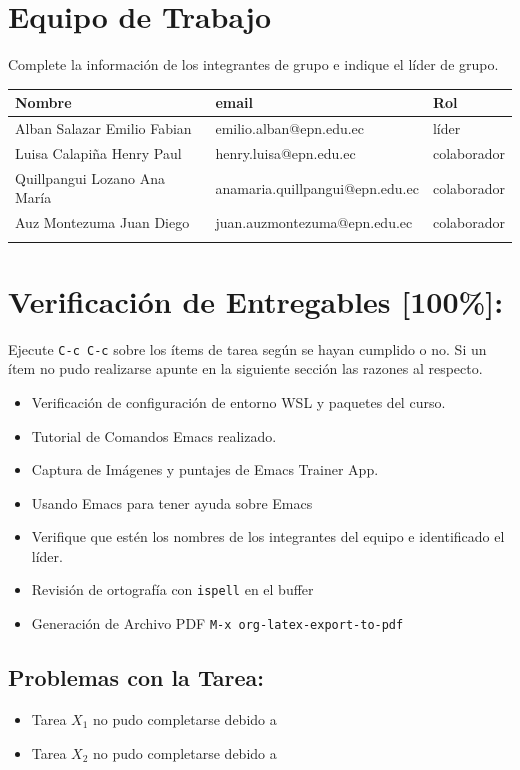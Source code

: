 \documentclass{article}
\begin{document}
\section{Equipo de Trabajo}
\label{sec:org3ceee4a}
Complete la información de los integrantes de grupo e indique el líder
de grupo.

\begin{center}
\begin{tabular}{lll}
\hline
Nombre & email & Rol\\[0pt]
\hline
Alban Salazar Emilio Fabian & emilio.alban@epn.edu.ec & líder\\[0pt]
Luisa Calapiña Henry Paul & henry.luisa@epn.edu.ec & colaborador\\[0pt]
Quillpangui Lozano Ana María & anamaria.quillpangui@epn.edu.ec & colaborador\\[0pt]
Auz Montezuma Juan Diego & juan.auzmontezuma@epn.edu.ec & colaborador\\[0pt]
 &  & \\[0pt]
\hline
\end{tabular}
\end{center}

\section{Verificación de Entregables [100\%]:}
\label{sec:orgfc84aa0}
Ejecute \texttt{C-c C-c} sobre los ítems de tarea según se hayan cumplido o
no. Si un ítem no pudo realizarse apunte en la siguiente sección las
razones al respecto.
\begin{itemize}
\item[{$\boxtimes$}] Verificación de configuración de entorno WSL y paquetes del curso.
\item[{$\boxtimes$}] Tutorial de Comandos Emacs realizado.
\item[{$\boxtimes$}] Captura de Imágenes y puntajes de Emacs Trainer App.
\item[{$\boxtimes$}] Usando Emacs para tener ayuda sobre Emacs
\item[{$\boxtimes$}] Verifique que estén los nombres de los integrantes del equipo e
identificado el líder.
\item[{$\boxtimes$}] Revisión de ortografía con \texttt{ispell} en el buffer
\item[{$\boxtimes$}] Generación de Archivo
PDF \texttt{M-x org-latex-export-to-pdf}
\end{itemize}
\subsection{Problemas con la Tarea:}
\label{sec:org026d71c}
\begin{itemize}
\item Tarea \(X_1\) no pudo completarse debido a
\item Tarea \(X_2\) no pudo completarse debido a
\end{itemize}
\end{document}
